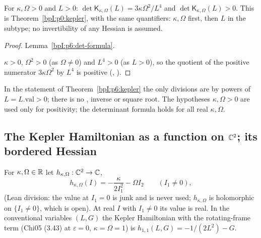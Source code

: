 \begin{theorem}\label{bpI:p6:kepler}
For $\kappa,\Omega>0$ and $L>0$: $\det\mathsf K_{\kappa,\Omega}(L)=3\kappa\Omega^2/L^4$ and $\det\mathsf K_{\kappa,\Omega}(L)>0$.
This is Theorem~\ref{bpI:p0:kepler}, with the same quantifiers: $\kappa,\Omega$ first, then $L$ in the subtype; no invertibility of any Hessian is assumed.
\end{theorem}
\begin{proof}
\label{stepI:p6:k-value} Lemma~\ref{bpI:p6:det-formula}.

\label{stepI:p6:k-pos} $\kappa>0$, $\Omega^2>0$ (as $\Omega\ne0$) and $L^4>0$ (as $L>0$), so the quotient of the positive numerator
$3\kappa\Omega^2$ by $L^4$ is positive (, ).
\end{proof}

\begin{remark}\label{bpI:p6:totality}
In the statement of Theorem~\ref{bpI:p6:kepler} the only divisions are by powers of $L=L.\mathrm{val}>0$; there is no ,
inverse or square root. The hypotheses $\kappa,\Omega>0$ are used only for positivity; the determinant formula holds for all real $\kappa,\Omega$.
\end{remark}

\subsection{The Kepler Hamiltonian as a function on $\mathbb{C}^2$; its bordered Hessian}\label{bpI:p6:sec-border}

\begin{definition}\label{bpI:p6:kep-ham}
For $\kappa,\Omega\in\mathbb{R}$ let $h_{\kappa,\Omega}:\mathbb{C}^2\to\mathbb{C}$,
\[
h_{\kappa,\Omega}(I)=-\frac{\kappa}{2I_1^2}-\Omega I_2\qquad(I_1\ne0),
\]
(Lean division: the value at $I_1=0$ is junk and is never used; $h_{\kappa,\Omega}$ is holomorphic on $\{I_1\ne0\}$, which is open).
At real $I$ with $I_1\neq0$ its value is real. In the conventional variables $(L,G)$ the Kepler Hamiltonian with the rotating-frame
term (Chi05 (3.43) at $\varepsilon=0$, $\kappa=\Omega=1$) is $h_{1,1}(L,G)=-1/(2L^2)-G$.
\end{definition}

